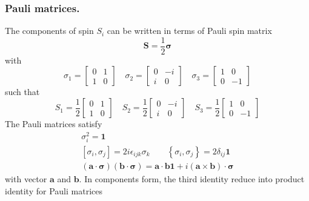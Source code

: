 \documentclass[../../../main.tex]{subfiles}
\begin{document}
\subsubsection{Pauli matrices.}
The components of spin $S_i$ can be written in terms of Pauli spin matrix
\begin{equation*}
    \mathbf{S} = \frac{1 }{2 } \boldsymbol{\sigma}
\end{equation*}
with
\begin{equation*}
    \sigma_1 =
    \begin{bmatrix}
        0 & 1 \\
        1 & 0
    \end{bmatrix}
    \quad
    \sigma_2 =
    \begin{bmatrix}
        0 & -i \\
        i & 0
    \end{bmatrix}
    \quad
    \sigma_3    =
    \begin{bmatrix}
        1 & 0  \\
        0 & -1
    \end{bmatrix}
\end{equation*}
such that
\begin{equation*}
    S_1 = \frac{1}{2}
    \begin{bmatrix}
        0 & 1 \\
        1 & 0
    \end{bmatrix}
    \quad
    S_2 = \frac{1}{2}
    \begin{bmatrix}
        0 & -i \\
        i & 0
    \end{bmatrix}
    \quad
    S_3 = \frac{1}{2}
    \begin{bmatrix}
        1 & 0  \\
        0 & -1
    \end{bmatrix}
\end{equation*}
The Pauli matrices satisfy
\begin{gather*}
    \sigma_i^2=\mathbf{1}  \\
    [\sigma_i, \sigma_j] = 2i \epsilon_{ijk} \sigma_k\qquad    \left\{ \sigma_i,\sigma_j \right\} = 2\delta_{ij }\mathbf{1}\\
    (\mathbf{a} \cdot \boldsymbol{\sigma})(\mathbf{b} \cdot \boldsymbol{\sigma}) = \mathbf{a} \cdot \mathbf{b} \mathbf{1} + i(\mathbf{a} \times \mathbf{b}) \cdot \boldsymbol{\sigma}
\end{gather*}
with vector $\mathbf{a}$ and $\mathbf{b}$.
In components form, the third identity reduce into product identity for Pauli matrices
\end{document}
